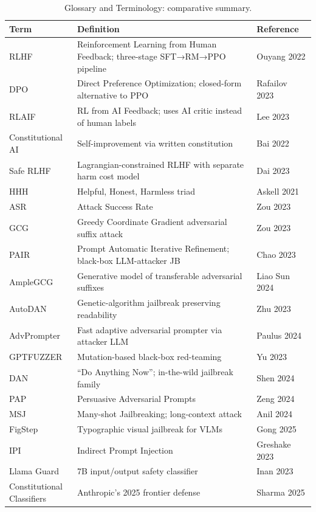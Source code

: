 \documentclass{article}
\begin{document}
\begin{table}[t]
\centering
\caption{Glossary and Terminology: comparative summary.}
\label{tab:glossary-and-terminology}
\begin{tabular}{>{\raggedright\arraybackslash}p{0.2248\linewidth}
  >{\raggedright\arraybackslash}p{0.5814\linewidth}
  >{\raggedright\arraybackslash}p{0.1938\linewidth}}
\toprule
Term & Definition & Reference \\
\midrule
RLHF & Reinforcement Learning from Human Feedback; three-stage SFT→RM→PPO pipeline & Ouyang 2022 \\
DPO & Direct Preference Optimization; closed-form alternative to PPO & Rafailov 2023 \\
RLAIF & RL from AI Feedback; uses AI critic instead of human labels & Lee 2023 \\
Constitutional AI & Self-improvement via written constitution & Bai 2022 \\
Safe RLHF & Lagrangian-constrained RLHF with separate harm cost model & Dai 2023 \\
HHH & Helpful, Honest, Harmless triad & Askell 2021 \\
ASR & Attack Success Rate & Zou 2023 \\
GCG & Greedy Coordinate Gradient adversarial suffix attack & Zou 2023 \\
PAIR & Prompt Automatic Iterative Refinement; black-box LLM-attacker JB & Chao 2023 \\
AmpleGCG & Generative model of transferable adversarial suffixes & Liao Sun 2024 \\
AutoDAN & Genetic-algorithm jailbreak preserving readability & Zhu 2023 \\
AdvPrompter & Fast adaptive adversarial prompter via attacker LLM & Paulus 2024 \\
GPTFUZZER & Mutation-based black-box red-teaming & Yu 2023 \\
DAN & ``Do Anything Now''; in-the-wild jailbreak family & Shen 2024 \\
PAP & Persuasive Adversarial Prompts & Zeng 2024 \\
MSJ & Many-shot Jailbreaking; long-context attack & Anil 2024 \\
FigStep & Typographic visual jailbreak for VLMs & Gong 2025 \\
IPI & Indirect Prompt Injection & Greshake 2023 \\
Llama Guard & 7B input/output safety classifier & Inan 2023 \\
Constitutional Classifiers & Anthropic's 2025 frontier defense & Sharma 2025 \\

\end{tabular}
\end{table}
\end{document}
